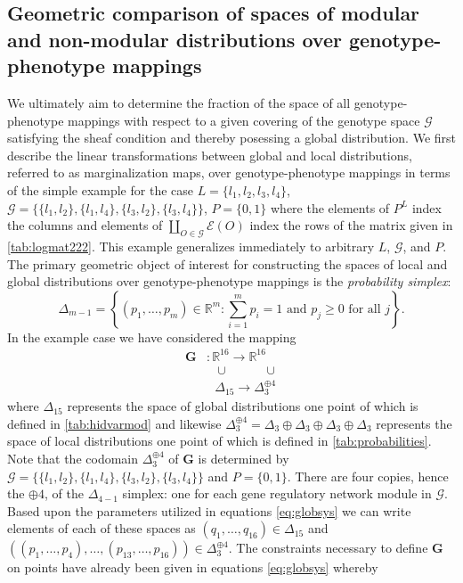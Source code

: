 \subsection{Geometric comparison of spaces of modular and non-modular distributions over genotype-phenotype mappings}
We ultimately aim to determine the fraction of the space of all genotype-phenotype mappings with respect to a given covering of the genotype space $\mathcal{G}$ satisfying the sheaf condition and thereby posessing a global distribution. We first describe the linear transformations between global and local distributions, referred to as marginalization maps, over genotype-phenotype mappings in terms of the simple example for the case $L = \{ l_1,l_2,l_3,l_4 \}$, $\mathcal{G} = \{\{l_1,l_2 \},\{l_1,l_4 \},\{l_3,l_2\},\{l_3,l_4\} \}$, $P=\{0,1\}$ where the elements of $P^L$ index the columns and elements of $\coprod_{O \in \mathcal{G}} \mathcal{E} (O)$ index the rows of the matrix given in \ref{tab:logmat222}. This example generalizes immediately to arbitrary $L$, $\mathcal{G}$, and $P$. The primary geometric object of interest for constructing the spaces of local and global distributions over genotype-phenotype mappings is the \emph{probability simplex}:
$$
\Delta_{m-1} = \left\{ (p_1, \ldots , p_m) \in \mathbb{R}^m \colon \sum_{i=1}^m p_i = 1 \text{ and } p_j \geq 0 \text{ for all } j \right\}.
$$
In the example case we have considered the mapping
\begin{equation}
\begin{aligned}\label{eq:marginalmap}
\mathbf{G} &\colon \mathbb{R}^{16} \longrightarrow \mathbb{R}^{16}\\
  &\,\,\,\, \cup \,\,\,\,\,\,\,\,\,\,\,\,\,\,\,\,\, \cup\\
  &\,\,\,\, \Delta_{15} \longrightarrow \Delta_3^{\oplus 4}
\end{aligned}
\end{equation}
where $\Delta_{15}$ represents the space of global distributions one point of which is defined in \ref{tab:hidvarmod} and likewise $\Delta_3^{\oplus 4} = \Delta_3 \oplus \Delta_3 \oplus \Delta_3 \oplus \Delta_3$ represents the space of local distributions one point of which is defined in \ref{tab:probabilities}. Note that the codomain $\Delta_3^{\oplus 4}$ of $\mathbf{G}$ is determined by $\mathcal{G} = \{\{l_1,l_2 \},\{l_1,l_4 \},\{l_3,l_2\},\{l_3,l_4\} \}$ and $P=\{0,1\}$. There are four copies, hence the $\oplus 4$, of the $\Delta_{4-1}$ simplex: one for each gene regulatory network module in $\mathcal{G}$. Based upon the parameters utilized in equations \ref{eq:globsys} we can write elements of each of these spaces as $(q_1, \ldots, q_{16}) \in \Delta_{15}$ and $((p_1, \ldots , p_4), \ldots, (p_{13},\ldots,p_{16})) \in \Delta_3^{\oplus 4}$. The constraints necessary to define $\mathbf{G}$ on points have already been given in equations \ref{eq:globsys} whereby
